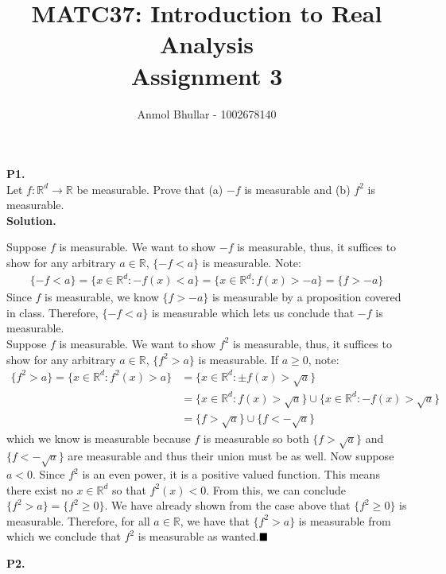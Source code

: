 \documentclass{article}
\title{MATC37: Introduction to Real Analysis\\
    Assignment 3}
\author{Anmol Bhullar - 1002678140}
\begin{document}
    \maketitle

    \textbf{P1.}\\

    Let $f: \mathbb{R}^d\to\mathbb{R}$ be measurable. Prove that (a) $-f$ is measurable and (b) $f^2$ is measurable.\\

    \textbf{Solution.}

    Suppose $f$ is measurable. We want to show $-f$ is measurable, thus, it suffices to show for any arbitrary
    $a\in\mathbb{R}$, $\{-f < a\}$ is measurable. Note:
    \begin{align*}
        \{-f < a\} = \{x\in\mathbb{R}^d: -f(x) < a\} = \{x\in\mathbb{R}^d: f(x) > -a\} = \{f > -a\} 
    \end{align*}
    Since $f$ is measurable, we know $\{f > -a\}$ is measurable by a proposition covered in class. Therefore, $\{-f < a\}$
    is measurable which lets us conclude that $-f$ is measurable.\\

    Suppose $f$ is measurable. We want to show $f^2$ is measurable, thus, it suffices to show for any arbitrary $a\in\mathbb{R}$,
    $\{f^2 > a\}$ is measurable. If $a\geq 0$, note:
    \begin{align*}
        \{f^2 > a\} = \{x\in\mathbb{R}^d: f^2(x) > a\} &= \{x\in\mathbb{R}^d: \pm f(x) > \sqrt{a}\} \\
            &= \{x\in\mathbb{R}^d: f(x) > \sqrt{a}\} \cup \{x\in\mathbb{R}^d: -f(x) > \sqrt{a}\} \\
            &= \{f > \sqrt{a}\} \cup \{f < -\sqrt{a}\}
    \end{align*}
    which we know is measurable because $f$ is measurable so both $\{f > \sqrt{a}\}$ and $\{f < -\sqrt{a}\}$ are measurable
    and thus their union must be as well. Now suppose $a < 0$. Since $f^2$ is an even power, it is a positive valued function.
    This means there exist no $x\in\mathbb{R}^d$ so that $f^2(x) < 0$. From this, we can conclude $\{f^2 > a\} = \{f^2 \geq 0\}$.
    We have already shown from the case above that $\{f^2 \geq 0\}$ is measurable. Therefore, for all $a\in\mathbb{R}$,
    we have that $\{f^2 > a\}$ is measurable from which we conclude that $f^2$ is measurable as wanted.$\hfill\blacksquare$

    \newpage

    \textbf{P2.}
\end{document}
